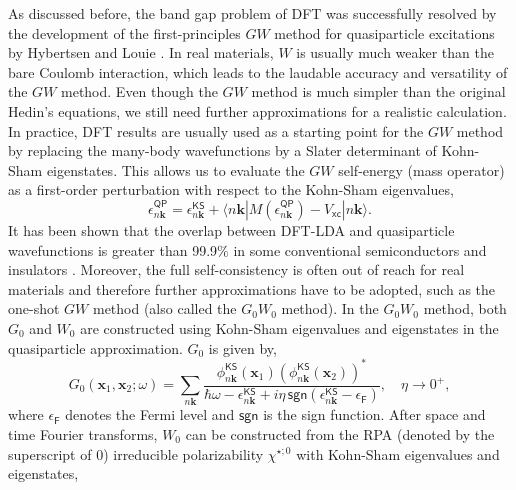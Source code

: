 \documentclass[11pt, oneside]{article}          %
\begin{document}
As discussed before, the band gap problem of DFT was successfully resolved by the development of the first-principles $GW$ method for quasiparticle excitations by Hybertsen and Louie \cite{hybertsen1986electron, hybertsen1985firstprinciples}. In real materials, $W$ is usually much weaker than the bare Coulomb interaction, which leads to the laudable accuracy and versatility of the $GW$ method. Even though the $GW$ method is much simpler than the original Hedin's equations, we still need further approximations for a realistic calculation. In practice, DFT results are usually used as a starting point for the $GW$ method by replacing the many-body wavefunctions by a Slater determinant of Kohn-Sham eigenstates. This allows us to evaluate the $GW$ self-energy (mass operator) as a first-order perturbation with respect to the Kohn-Sham eigenvalues,
\begin{equation}
  \label{eq:GW_correction_perturbation}
  \epsilon^{\mathsf{QP}}_{n{\bm k}} = \epsilon^{\mathsf{KS}}_{n{\bm k}} + \langle n {\bm k} | M(\epsilon^{\mathsf{QP}}_{n {\bm k}}) - V_{\mathsf{xc}} | n {\bm k} \rangle.
\end{equation}
It has been shown that the overlap between DFT-LDA and quasiparticle wavefunctions is greater than 99.9\% in some conventional semiconductors and insulators \cite{hybertsen1986electron}. Moreover, the full self-consistency is often out of reach for real materials and therefore further approximations have to be adopted, such as the one-shot $GW$ method (also called the $G_0 W_0$ method). In the $G_0 W_0$ method, both $G_0$ and $W_0$ are constructed using Kohn-Sham eigenvalues and eigenstates in the quasiparticle approximation. $G_0$ is given by,
\begin{equation}
  \label{eq:G_GW_approximation}
  G_0({\bm x}_1, {\bm x}_2;\omega) = \sum_{n{\bm k}} \frac{\phi^{\mathsf{KS}}_{n {\bm k}}({\bm x}_1) (\phi^{\mathsf{KS}}_{n {\bm k}}({\bm x}_2))^{*} }{ \hbar \omega - \epsilon^{\mathsf{KS}}_{n {\bm k}} + i \eta \, \mathsf{sgn}(\epsilon^{\mathsf{KS}}_{n{\bm k}} - \epsilon_{\mathsf{F}}) }, \quad \eta \rightarrow 0^{+},
\end{equation}
where $\epsilon_{\mathsf{F}}$ denotes the Fermi level and $\mathsf{sgn}$ is the sign function. After space and time Fourier transforms, $W_0$ can be constructed from the RPA (denoted by the superscript of $0$) irreducible polarizability $\chi^{\star;0}$ with Kohn-Sham eigenvalues and eigenstates,
\end{document}
